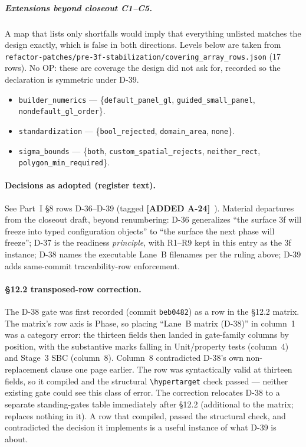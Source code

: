 \documentclass[
  10pt,
]{article}
\providecommand{\tightlist}{%
  \setlength{\itemsep}{0pt}\setlength{\parskip}{0pt}}
\newcommand{\amdnew}[1]{{\color{amdcolor}\footnotesize\textbf{[ADDED #1]}}\ }
\begin{document}
\subparagraph{Extensions beyond closeout C1--C5.}
A map that lists only shortfalls would imply that everything unlisted matches the design exactly, which is false in both directions. Levels below are taken from \texttt{refactor-patches/pre-3f-stabilization/covering\_array\_rows.json} (17 rows). No OP: these are coverage the design did not ask for, recorded so the declaration is symmetric under D-39.
\begin{itemize}
\tightlist
\item \texttt{builder\_numerics} --- \{\texttt{default\_panel\_gl}, \texttt{guided\_small\_panel}, \texttt{nondefault\_gl\_order}\}.
\item \texttt{standardization} --- \{\texttt{bool\_rejected}, \texttt{domain\_area}, \texttt{none}\}.
\item \texttt{sigma\_bounds} --- \{\texttt{both}, \texttt{custom\_spatial\_rejects}, \texttt{neither\_rect}, \texttt{polygon\_min\_required}\}.
\end{itemize}

\paragraph{Decisions as adopted (register text).}
See Part~I §8 rows D-36--D-39 (tagged \amdnew{A-24}). Material departures from the closeout draft, beyond renumbering: D-36 generalizes ``the surface 3f will freeze into typed configuration objects'' to ``the surface the next phase will freeze''; D-37 is the readiness \emph{principle}, with R1--R9 kept in this entry as the 3f instance; D-38 names the executable Lane~B filenames per the ruling above; D-39 adds same-commit traceability-row enforcement.

\paragraph{§12.2 transposed-row correction.}
The D-38 gate was first recorded (commit \texttt{beb0482}) as a row in the §12.2 matrix. The matrix's row axis is Phase, so placing ``Lane~B matrix (D-38)'' in column~1 was a category error: the thirteen fields then landed in gate-family columns by position, with the substantive marks falling in Unit/property tests (column~4) and Stage~3 SBC (column~8). Column~8 contradicted D-38's own non-replacement clause one page earlier. The row was syntactically valid at thirteen fields, so it compiled and the structural \texttt{\textbackslash hypertarget} check passed --- neither existing gate could see this class of error. The correction relocates D-38 to a separate standing-gates table immediately after §12.2 (additional to the matrix; replaces nothing in it). A row that compiled, passed the structural check, and contradicted the decision it implements is a useful instance of what D-39 is about.
\end{document}
